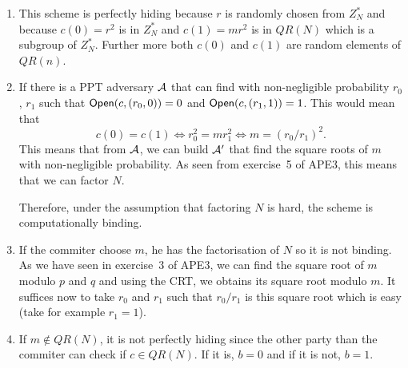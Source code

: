 \begin{solution}
  \begin{enumerate}
    \item
      This scheme is perfectly hiding because $r$ is randomly chosen from
      $Z^{*}_{N}$ and because $c(0) = r^{2}$ is in $Z^{*}_{N}$ and $c(1) = mr^{2}$ is in
      $QR(N)$ which is a subgroup of $Z^{*}_{N}$.
      Further more both $c(0)$ and $c(1)$ are random elements of $QR(n)$.
    \item
      If there is a PPT adversary $\mathcal{A}$ that can find with non-negligible probability
      $r_{0}$, $r_{1}$ such that $\operatorname{\mathsf{Open}}(c, (r_{0}, 0))=0$ and
      $\operatorname{\mathsf{Open}}(c, (r_{1}, 1))=1$. This would mean that
      \[ c(0)=c(1) \Leftrightarrow r_{0}^{2}=mr_{1}^{2} \Leftrightarrow m=(r_{0}/r_{1})^{2}. \]
      This means that from $\mathcal{A}$, we can build $\mathcal{A}'$ that find the square roots of $m$ with non-negligible probability.
      As seen from exercise~5 of APE3, this means that we can factor $N$.

      Therefore, under the assumption that factoring $N$ is hard, the scheme is computationally binding.
    \item
      If the commiter choose $m$, he has the factorisation of $N$ so it is not binding.
      As we have seen in exercise~3 of APE3, we can find the square root of $m$ modulo $p$ and $q$
      and using the CRT, we obtains its square root modulo $m$.
      It suffices now to take $r_0$ and $r_1$ such that $r_{0}/r_{1}$ is this square root which is easy (take for example $r_1 = 1$).
    \item
      If $m \not\in QR(N)$, it is not perfectly hiding since the other party than the commiter can
      check if $c \in QR(N)$.
      If it is, $b = 0$ and if it is not, $b = 1$.


\end{enumerate}
\end{solution}
